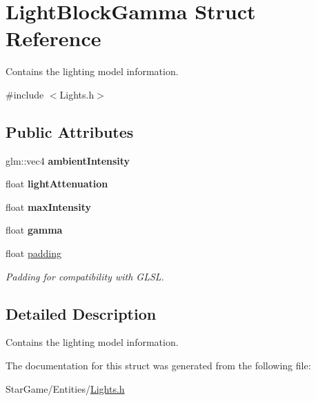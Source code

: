\hypertarget{struct_light_block_gamma}{\section{Light\-Block\-Gamma Struct Reference}
\label{struct_light_block_gamma}
}


Contains the lighting model information.  




{\ttfamily \#include $<$Lights.\-h$>$}

\subsection*{Public Attributes}
\begin{DoxyCompactItemize}
\item 
\hypertarget{struct_light_block_gamma_af05e4962e324d88738da3f626520d828}{glm\-::vec4 {\bfseries ambient\-Intensity}}\label{struct_light_block_gamma_af05e4962e324d88738da3f626520d828}

\item 
\hypertarget{struct_light_block_gamma_ab77927d8f380cac2ef16b86dc518053e}{float {\bfseries light\-Attenuation}}\label{struct_light_block_gamma_ab77927d8f380cac2ef16b86dc518053e}

\item 
\hypertarget{struct_light_block_gamma_aa41101b7cba89596e28b6a562482d48d}{float {\bfseries max\-Intensity}}\label{struct_light_block_gamma_aa41101b7cba89596e28b6a562482d48d}

\item 
\hypertarget{struct_light_block_gamma_a970025c01815b63fe792268fd9f2a3f2}{float {\bfseries gamma}}\label{struct_light_block_gamma_a970025c01815b63fe792268fd9f2a3f2}

\item 
\hypertarget{struct_light_block_gamma_a49bf0ee1be155d8c78bf93c5ece2a98e}{float \hyperlink{struct_light_block_gamma_a49bf0ee1be155d8c78bf93c5ece2a98e}{padding}}\label{struct_light_block_gamma_a49bf0ee1be155d8c78bf93c5ece2a98e}

\begin{DoxyCompactList}\small\item\em Padding for compatibility with G\-L\-S\-L. \end{DoxyCompactList}\end{DoxyCompactItemize}


\subsection{Detailed Description}
Contains the lighting model information. 

The documentation for this struct was generated from the following file\-:\begin{DoxyCompactItemize}
\item 
Star\-Game/\-Entities/\hyperlink{_lights_8h}{Lights.\-h}\end{DoxyCompactItemize}

